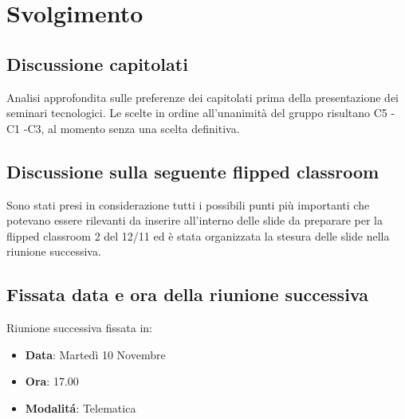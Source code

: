 \documentclass[]{article}
\begin{document}
	\newpage

	\section{Svolgimento}
	\subsection{Discussione capitolati}
	 Analisi approfondita sulle preferenze dei capitolati prima della presentazione dei seminari tecnologici. Le scelte in ordine all'unanimità del gruppo risultano C5 - C1 -C3, al momento senza una scelta definitiva.

	\subsection{Discussione sulla seguente flipped classroom}
	Sono stati presi in considerazione tutti i possibili punti più importanti che potevano essere rilevanti da inserire all'interno delle slide da preparare per la flipped classroom 2  del 12/11 ed è stata organizzata la stesura delle slide nella riunione successiva.
	\subsection{Fissata data e ora della riunione successiva}
	Riunione successiva fissata in:
	\begin{itemize}
		\item \textbf{Data}: Martedì 10 Novembre
		\item \textbf{Ora}: 17.00
		\item \textbf{Modalitá}: Telematica
	\end{itemize}

	
\end{document}
